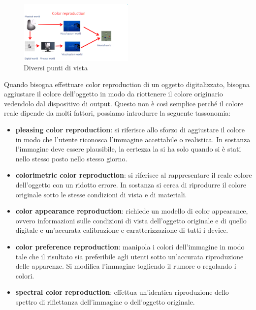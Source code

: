 \begin{figure}
    \centering
    \includegraphics[width=0.5\textwidth]{img/descrizione_colore.png}
    \caption{Diversi punti di vista}
    \label{fig:significato_colore}
\end{figure}

Quando bisogna effettuare color reproduction di un oggetto digitalizzato, bisogna 
aggiustare il colore dell'oggetto in modo da riottenere il colore originario vedendolo 
dal dispositivo di output. Questo non è così semplice perché il colore reale 
dipende da molti fattori, possiamo introdurre la seguente tassonomia:
\begin{itemize}
    \item \textbf{pleasing color reproduction}: si riferisce allo sforzo di aggiustare 
    il colore in modo che l'utente riconosca l'immagine accettabile o realistica. 
    In sostanza l'immagine deve essere plausibile, la certezza la si ha solo quando 
    si è stati nello stesso posto nello stesso giorno.
    \item \textbf{colorimetric color reproduction}: si riferisce al rappresentare 
    il reale colore dell'oggetto con un ridotto errore. In sostanza si cerca di 
    riprodurre il colore originale sotto le stesse condizioni di vista e di materiali.
    \item \textbf{color appearance reproduction}: richiede un modello di color appearance,
    ovvero informazioni sulle condizioni di vista dell'oggetto originale e di quello 
    digitale e un'accurata calibrazione e caratterizzazione di tutti i device.
    \item \textbf{color preference reproduction}: manipola i colori dell'immagine in
    modo tale che il risultato sia preferibile agli utenti sotto un'accurata riproduzione 
    delle apparenze. Si modifica l'immagine togliendo il rumore o regolando i colori.
    \item \textbf{spectral color reproduction}: effettua un'identica riproduzione
    dello spettro di riflettanza dell'immagine o dell'oggetto originale.
\end{itemize} 

